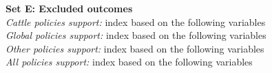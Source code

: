 \documentclass{article}
\begin{document}
\noindent \textbf{Set E: Excluded outcomes}\\
\textit{Cattle policies support:} index based on the following variables \\
\textit{Global policies support:} index based on the following variables \\
\textit{Other policies support:} index based on the following variables \\
\textit{All policies support:} index based on the following variables\\
\end{document}
